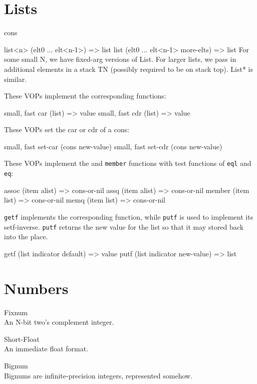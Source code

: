 {
\chapter{Lists}


cons

list<n> (elt0 ... elt<n-1>) => list
list (elt0 ... elt<n-1> more-elts) => list
    For some small N, we have fixed-arg versions of List.  For larger lists, we
    pass in additional elements in a stack TN (possibly required to be on stack
    top).  List* is similar.


These VOPs implement the corresponding \clisp functions:
\begin{example}
{small, fast} car (list) => value 
{small, fast} cdr (list) => value 
\end{example}

These VOPs set the car or cdr of a cons:
\begin{example}
{small, fast} set-car (cons new-value)
{small, fast} set-cdr (cons new-value)
\end{example}

These VOPs implement the  and {\tt member} functions with test
functions of {\tt eql} and {\tt eq}:
\begin{example}
assoc (item alist) => cons-or-nil
assq (item alist) => cons-or-nil
member (item list) => cons-or-nil
memq (item list) => cons-or-nil
\end{example}


{\tt getf} implements the corresponding \clisp function, while {\tt putf} is used
to implement its setf-inverse.  {\tt putf} returns the new value for the list so
that it may stored back into the place.
\begin{example}
getf (list indicator default) => value
putf (list indicator new-value) => list
\end{example}


\chapter{Numbers}

Fixnum\\An N-bit two's complement integer.

Short-Float\\An immediate float format.

\label{Bignums}
Bignum\\Bignums are infinite-precision integers, represented somehow.

}
